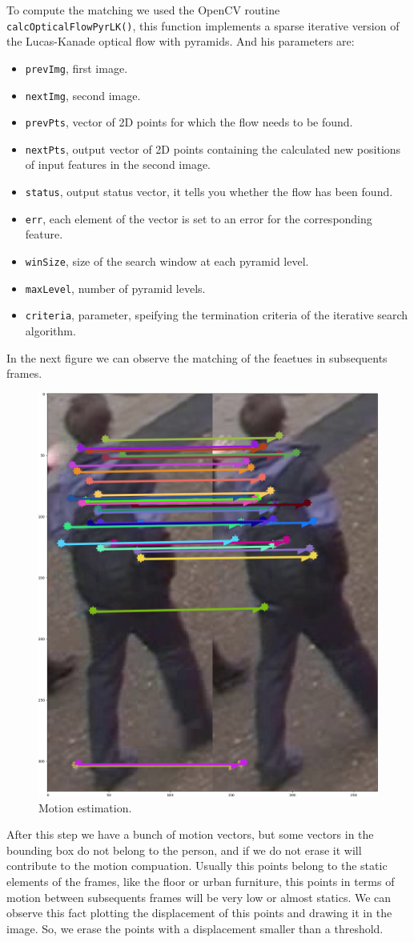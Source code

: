 \documentclass[12pt, a4paper, titlepage,twoside,openright]{article}
\begin{document}
To compute the matching we used the OpenCV routine \texttt{calcOpticalFlowPyrLK()}, this function implements a sparse iterative version of the Lucas-Kanade optical flow with pyramids. And his parameters are:
 
\begin{itemize}

\item \texttt{prevImg}, first image.
\item \texttt{nextImg}, second image.
\item \texttt{prevPts}, vector of 2D points for which the flow needs to be found. 
\item \texttt{nextPts}, output vector of 2D points containing the calculated new positions of input features in the second image. 
\item \texttt{status}, output status vector, it tells you whether the flow has been found.  
\item \texttt{err}, each element of the vector is set to an error for the corresponding feature.
\item \texttt{winSize}, size of the search window at each pyramid level. 
\item \texttt{maxLevel}, number of pyramid levels.  
\item \texttt{criteria}, parameter, speifying the termination criteria of the iterative search algorithm.
\end{itemize}


In the next figure we can observe the matching of the feaetues in subsequents frames.

\begin{figure}[hptb]
\centering         
\includegraphics[width=0.3\linewidth]{implementation/matching.png}
\caption{Motion estimation.} \label{motion1}
\end{figure}


After this step we have a bunch of motion vectors, but some vectors in the bounding box do not belong to the person, and if we do not erase it will contribute to the motion compuation. Usually this points belong to the static elements of the frames, like the floor or urban furniture, this points in terms of motion between subsequents frames will be very low or almost statics. We can observe this fact plotting the displacement of this points and drawing it in the image. So, we erase the points with a displacement smaller than a threshold. 
\end{document}
